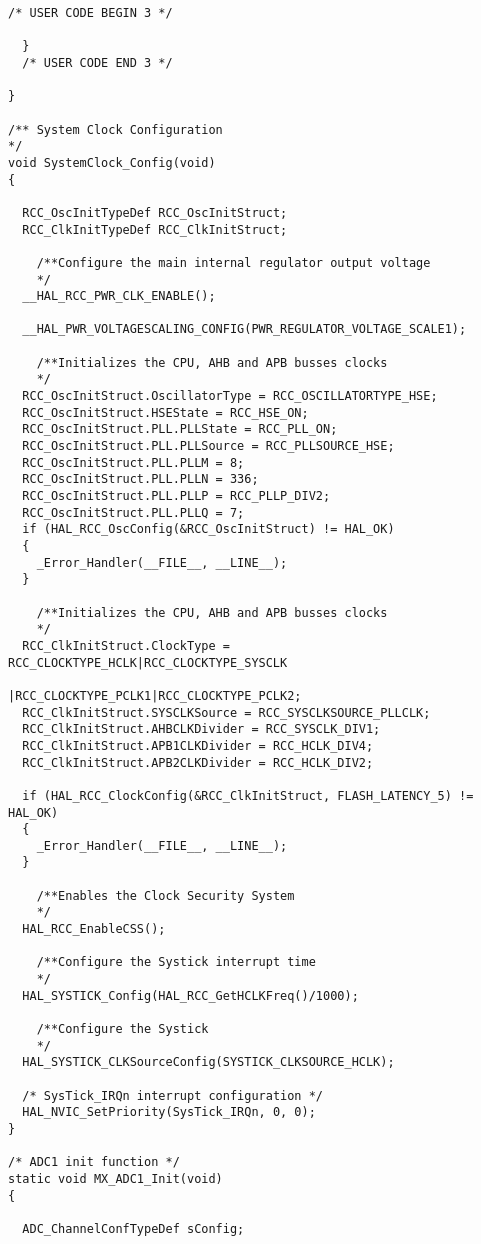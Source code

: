 \begin{lstlisting}[label=algoritmo:main.c,style = STM-code,frame=single,caption=main.c]
  /* USER CODE BEGIN 3 */

  }
  /* USER CODE END 3 */

}

/** System Clock Configuration
*/
void SystemClock_Config(void)
{

  RCC_OscInitTypeDef RCC_OscInitStruct;
  RCC_ClkInitTypeDef RCC_ClkInitStruct;

    /**Configure the main internal regulator output voltage 
    */
  __HAL_RCC_PWR_CLK_ENABLE();

  __HAL_PWR_VOLTAGESCALING_CONFIG(PWR_REGULATOR_VOLTAGE_SCALE1);

    /**Initializes the CPU, AHB and APB busses clocks 
    */
  RCC_OscInitStruct.OscillatorType = RCC_OSCILLATORTYPE_HSE;
  RCC_OscInitStruct.HSEState = RCC_HSE_ON;
  RCC_OscInitStruct.PLL.PLLState = RCC_PLL_ON;
  RCC_OscInitStruct.PLL.PLLSource = RCC_PLLSOURCE_HSE;
  RCC_OscInitStruct.PLL.PLLM = 8;
  RCC_OscInitStruct.PLL.PLLN = 336;
  RCC_OscInitStruct.PLL.PLLP = RCC_PLLP_DIV2;
  RCC_OscInitStruct.PLL.PLLQ = 7;
  if (HAL_RCC_OscConfig(&RCC_OscInitStruct) != HAL_OK)
  {
    _Error_Handler(__FILE__, __LINE__);
  }

    /**Initializes the CPU, AHB and APB busses clocks 
    */
  RCC_ClkInitStruct.ClockType = RCC_CLOCKTYPE_HCLK|RCC_CLOCKTYPE_SYSCLK
                              |RCC_CLOCKTYPE_PCLK1|RCC_CLOCKTYPE_PCLK2;
  RCC_ClkInitStruct.SYSCLKSource = RCC_SYSCLKSOURCE_PLLCLK;
  RCC_ClkInitStruct.AHBCLKDivider = RCC_SYSCLK_DIV1;
  RCC_ClkInitStruct.APB1CLKDivider = RCC_HCLK_DIV4;
  RCC_ClkInitStruct.APB2CLKDivider = RCC_HCLK_DIV2;

  if (HAL_RCC_ClockConfig(&RCC_ClkInitStruct, FLASH_LATENCY_5) != HAL_OK)
  {
    _Error_Handler(__FILE__, __LINE__);
  }

    /**Enables the Clock Security System 
    */
  HAL_RCC_EnableCSS();

    /**Configure the Systick interrupt time 
    */
  HAL_SYSTICK_Config(HAL_RCC_GetHCLKFreq()/1000);

    /**Configure the Systick 
    */
  HAL_SYSTICK_CLKSourceConfig(SYSTICK_CLKSOURCE_HCLK);

  /* SysTick_IRQn interrupt configuration */
  HAL_NVIC_SetPriority(SysTick_IRQn, 0, 0);
}

/* ADC1 init function */
static void MX_ADC1_Init(void)
{

  ADC_ChannelConfTypeDef sConfig;


\end{lstlisting}
